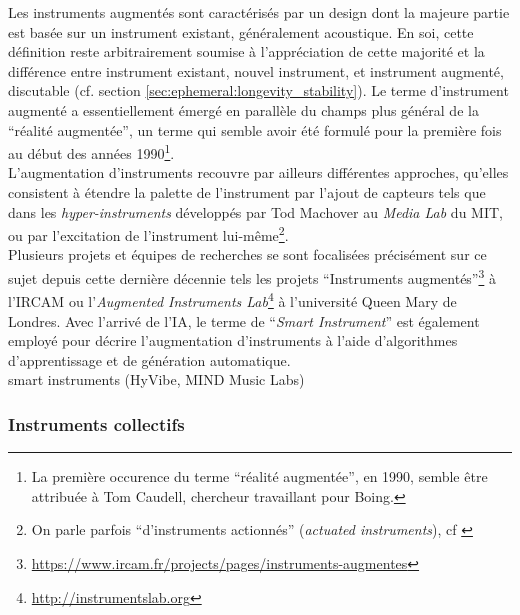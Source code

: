 \noindent Les instruments augmentés sont caractérisés par un design dont la majeure partie est basée sur un instrument existant, généralement acoustique. En soi, cette définition reste arbitrairement soumise à l'appréciation de cette majorité et la différence entre instrument existant, nouvel instrument, et instrument augmenté, discutable (cf. section \ref{sec:ephemeral:longevity_stability}). Le terme d'instrument augmenté a essentiellement émergé en parallèle du champs plus général de la ``réalité augmentée'', un terme qui semble avoir été formulé pour la première fois au début des années 1990\footnote{La première occurence du terme ``réalité augmentée'', en 1990, semble être attribuée à Tom Caudell, chercheur travaillant pour Boing.}.\\
\indent L'augmentation d'instruments recouvre par ailleurs différentes approches, qu'elles consistent à étendre la palette de l'instrument par l'ajout de capteurs tels que dans les \textit{hyper-instruments}\cite{machover_hyperinstruments_1991} développés par Tod Machover au \textit{Media Lab} du \gls{MIT}, ou par l'excitation de l'instrument lui-même\footnote{On parle parfois ``d'instruments actionnés'' (\textit{actuated instruments}), cf \cite{overholt_advancements_2011}}.\\
\indent Plusieurs projets et équipes de recherches se sont focalisées précisément sur ce sujet depuis cette dernière décennie tels les projets ``Instruments augmentés''\footnote{\url{https://www.ircam.fr/projects/pages/instruments-augmentes}} à l'\gls{IRCAM} ou l'\textit{Augmented Instruments Lab}\footnote{\url{http://instrumentslab.org}} à l'université Queen Mary de Londres.
\indent Avec l'arrivé de l'\gls{IA}, le terme de ``\textit{Smart Instrument}'' est également employé pour décrire l'augmentation d'instruments à l'aide d'algorithmes d'apprentissage et de génération automatique.\\
smart instruments (HyVibe, MIND Music Labs)



\subsubsection{Instruments collectifs}
\label{sec:ephemeral:origins:collectiveDMIs}


